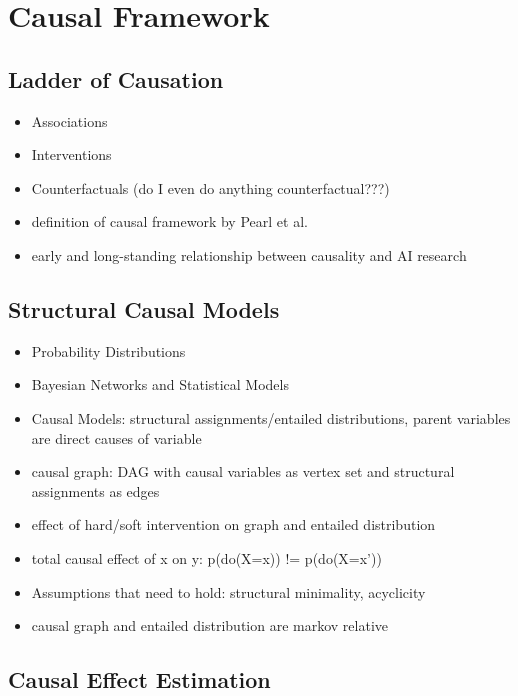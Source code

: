 \section{Causal Framework}
\subsection{Ladder of Causation}
\begin{itemize}
    \item Associations
    \item Interventions
    \item Counterfactuals (do I even do anything counterfactual???)
    \item definition of causal framework by Pearl et al. 
    \item early and long-standing relationship between causality and AI research
\end{itemize}

\subsection{Structural Causal Models}
\begin{itemize}
    \item Probability Distributions
    \item Bayesian Networks and Statistical Models
    \item Causal Models: structural assignments/entailed distributions, parent variables are direct causes of variable 
    \item causal graph: DAG with causal variables as vertex set and structural assignments as edges
    \item effect of hard/soft intervention on graph and entailed distribution
    \item total causal effect of x on y: p(do(X=x)) != p(do(X=x'))
    \item Assumptions that need to hold: structural minimality, acyclicity
    \item causal graph and entailed distribution are markov relative
\end{itemize}

\subsection{Causal Effect Estimation}


